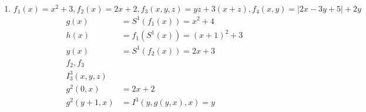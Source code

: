 \documentclass[a4paper,12pt, centered]{article}
\begin{document}
\begin{enumerate}
\begin{align*}
q_5Yq_5yL, q_5Zq_5zL, q_5\#q_{\textrm{fx}}\#R, q_{\textrm{fx}}yq_{\textrm{fx}}yR, q_{\textrm{fx}}zq_{\textrm{fx}}zR, q_{\textrm{fx}}xq_{\textrm{delx}}xR, q_{\textrm{delx}}yq_{\textrm{delx}}yR, \\&q_{\textrm{delx}}zq_{\textrm{delx}}zR, q_{\textrm{delx}}\#q_{\textrm{end}}\#S, q_{\textrm{delx}}xq_60L, q_6xq_6xL, q_6yq_6yL, q_6zq_6zL, q_6\#q_7\#S, q_7\#q_7\#R,\\& q_7xq_{\textrm{x}}xR, q_7yq_{\textrm{y}}yR, q_7zq_{\textrm{z}}zR, q_{\textrm{x}}0q_{\textrm{addzero}}xL, q_{\textrm{x}}yq_{\textrm{y}}yR, q_{\textrm{x}}zq_{\textrm{z}}zR, q_{\textrm{y}}zq_{\textrm{z}}zR, q_{\textrm{z}}yq_{\textrm{y}}yR, \\&q_{\textrm{y}}yq_{\textrm{y}}yR, q_{\textrm{x}}xq_{\textrm{x}}xR, q_{\textrm{z}}zq_{\textrm{z}}zR, q_{\textrm{z}}xq_{\textrm{x}}xR, q_{\textrm{y}}0q_{\textrm{addzero}}yL, q_{\textrm{z}}0q_{\textrm{addzero}}zL, q_{\textrm{addzero}}zq_60L,\\& q_{\textrm{addzero}}xq_60L, q_{\textrm{addzero}}yq_60L, q_{\textrm{x}}\#q_{\textrm{end}}\#S, q_{\textrm{y}}\#q_{\textrm{end}}\#S, q_{\textrm{z}}\#q_{\textrm{end}}\#S, q_70q_{\textrm{end}}\#S\}
			\end{align*}
		\item $f_1(x)=x^2+3,f_2(x)=2x+2,f_3(x,y,z)=yz+3(x+z),f_4(x,y)=|2x-3y+5|+2y$
			\begin{align*}
				g(x)&=S^1(f_1(x))=x^2+4\\
				h(x)&=f_1(S^1(x))=(x+1)^2+3\\
				y(x)&=S^1(f_2(x))=2x+3\\f_2,f_3\\I_3^3(x,y,z)\\g^2(0,x)&=2x+2\\g^2(y+1,x)&=I^3(y,g(y,x),x)=y
			\end{align*}
\end{enumerate}
\end{document}
